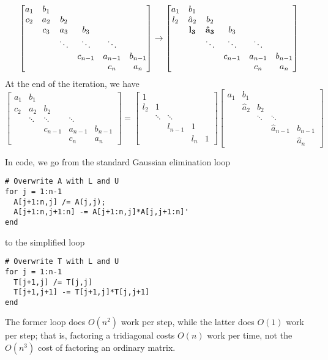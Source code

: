 \documentclass[12pt, leqno]{article}
\begin{document}
\[
  \begin{bmatrix}
  a_1 & b_1 \\
  c_2 & a_2 & b_2 \\
      & c_3 & a_3 & b_3 \\
      &     & \ddots & \ddots & \ddots \\
      &     &        & c_{n-1} & a_{n-1} & b_{n-1} \\
      &     &        &        & c_n     & a_n
  \end{bmatrix} \rightarrow
  \begin{bmatrix}
  a_1 & b_1 \\
  l_2 & \hat{a}_2 & b_2 \\
      & {\bf l_3} & {\bf \hat{a}_3} & b_3 \\
      &     & \ddots & \ddots & \ddots \\
      &     &        & c_{n-1} & a_{n-1} & b_{n-1} \\
      &     &        &        & c_n     & a_n
  \end{bmatrix}
\]
At the end of the iteration, we have
\[
  \begin{bmatrix}
  a_1 & b_1 \\
  c_2 & a_2 & b_2 \\
      & \ddots & \ddots & \ddots \\
      &        & c_{n-1} & a_{n-1} & b_{n-1} \\
      &        &        & c_n     & a_n
  \end{bmatrix} =
  \begin{bmatrix}
  1 & \\
  l_2 & 1 &  \\
      & \ddots & \ddots & \\
      &        & l_{n-1} & 1 \\
      &        &        & l_n     & 1
  \end{bmatrix}
  \begin{bmatrix}
  a_1 & b_1 \\
      & \hat{a}_2 & b_2 \\
      &      & \ddots & \ddots \\
      &        &      & \hat{a}_{n-1} & b_{n-1} \\
      &        &        &     & \hat{a}_n
  \end{bmatrix}
\]

In code, we go from the standard Gaussian elimination loop
\begin{lstlisting}
# Overwrite A with L and U
for j = 1:n-1
  A[j+1:n,j] /= A(j,j);
  A[j+1:n,j+1:n] -= A[j+1:n,j]*A[j,j+1:n]'
end
\end{lstlisting}
to the simplified loop
\begin{lstlisting}
# Overwrite T with L and U
for j = 1:n-1
  T[j+1,j] /= T[j,j]
  T[j+1,j+1] -= T[j+1,j]*T[j,j+1]
end
\end{lstlisting}
The former loop does $O(n^2)$ work per step, while the latter does
$O(1)$ work per step; that is, factoring a tridiagonal costs $O(n)$
work per time, not the $O(n^3)$ cost of factoring an ordinary matrix.
\end{document}
